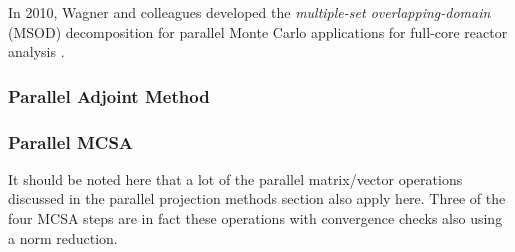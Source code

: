 In 2010, Wagner and colleagues developed the \textit{multiple-set
  overlapping-domain} (MSOD) decomposition for parallel Monte Carlo
applications for full-core reactor analysis
\citep{wagner_hybrid_2010}.

\subsubsection{Parallel Adjoint Method}
\label{subsubsec:parallel_adjoint}

\subsubsection{Parallel MCSA}
\label{subsubsec:parallel_mcsa}
It should be noted here that a lot of the parallel matrix/vector
operations discussed in the parallel projection methods section also
apply here. Three of the four MCSA steps are in fact these operations
with convergence checks also using a norm reduction.
